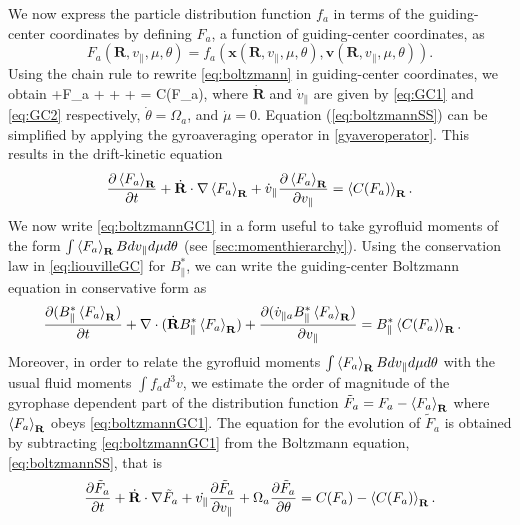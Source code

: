 {We now express the particle distribution function $f_a$ in terms of the guiding-center coordinates {by defining $F_a$, a function of guiding-center coordinates, as}
%
\begin{equation}
    F_a(\mathbf R, v_\parallel, \mu, \theta) = f_a(\mathbf x(\mathbf R, v_\parallel, \mu, \theta), \mathbf v(\mathbf R, v_\parallel, \mu, \theta)).
    \label{eq:fguidF}
\end{equation}
%
Using the chain rule to rewrite \cref{eq:boltzmann} in guiding-center coordinates, we obtain
%
\be
     +\cdot \nabla F_a +  + \dot \mu {}+ \dot \theta {} = C(F_a),
     \label{eq:boltzmannSS}
\ee
%
where $\dot{\mathbf R}$ and $\dot v_\parallel$ are given by \cref{eq:GC1} and \cref{eq:GC2} respectively, $\dot \theta = \Omega_a$, and $\dot \mu = 0$.
Equation (\ref{eq:boltzmannSS}) can be simplified by applying the gyroaveraging operator in \cref{gyaveroperator}. This results in the drift-kinetic equation
%
\begin{equation}
    \frac{\partial \left< F_a \right>_{\mathbf R}}{\partial t}+ \dot{\mathbf R} \cdot \nabla\left< F_a \right>_{\mathbf R} + \dot v_{\parallel}\frac{\partial \left< F_a \right>_{\mathbf R}}{\partial v_\parallel} = \left< C(F_a)\right>_{\mathbf R}.
    \label{eq:boltzmannGC1}
\end{equation}
%
We now write \cref{eq:boltzmannGC1} in a form useful to take gyrofluid moments of the form $\int \left< F_a \right>_{\mathbf R} B dv_\parallel d\mu d\theta$ (see \cref{sec:momenthierarchy}). Using the conservation law in \cref{eq:liouvilleGC} for $B_{\parallel}^{*}$, we can write the guiding-center Boltzmann equation in conservative form as
%
\begin{equation}
    \begin{split}
        &\frac{\partial (B_{\parallel}^*\left< F_a \right>_{\mathbf R})}{\partial t}+ \nabla \cdot ( \dot{\mathbf R} B_{\parallel}^*\left< F_a \right>_{\mathbf R}) + \frac{\partial( \dot v_{\parallel a} B_{\parallel}^*\left< F_a \right>_{\mathbf R})}{\partial v_\parallel} = B_{\parallel}^*\left< C(F_a)\right>_{\mathbf R}. 
    \end{split}
    \label{eq:boltzmannGC}
\end{equation}
%
Moreover, in order to relate the gyrofluid moments $\int \left< F_a \right>_{\mathbf R} B dv_\parallel d\mu d\theta$ with the usual fluid moments $\int f_a d^3 v$, we estimate the order of magnitude of the gyrophase dependent part of the distribution function $\tilde F_a = F_a - \left< F_a \right>_{\mathbf R}$ where $\left< F_a \right>_{\mathbf R}$ obeys \cref{eq:boltzmannGC1}. The equation for the evolution of $\tilde F_a$ is obtained by subtracting \cref{eq:boltzmannGC1} from the Boltzmann equation, \cref{eq:boltzmannSS}, that is
%
\begin{equation}
    \frac{\partial \tilde F_a}{\partial t}+\dot{\mathbf R}\cdot \nabla \tilde F_a + \dot{v_\parallel}\frac{\partial \tilde F_a}{\partial v_\parallel} + \Omega_a \frac{\partial \tilde F_a}{\partial \theta} = C(F_a)-\left< C(F_a)\right>_{\mathbf R}.
    \label{eq:boltztilde}
\end{equation}

}
